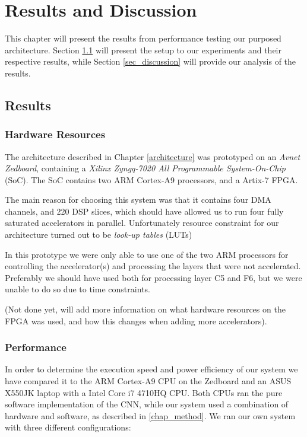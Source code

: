 \chapter{Results and Discussion} \label{chap_results}

This chapter will present the results from performance testing our purposed architecture. Section \ref{sec_results} will present the setup to our experiments and their respective results, while Section \ref{sec_discussion} will provide our analysis of the results. 

\section{Results} \label{sec_results}

\subsection{Hardware Resources}

The architecture described in Chapter \ref{architecture} was prototyped on an \textit{Avnet Zedboard}, containing a \textit{Xilinx Zyngq-7020 All Programmable System-On-Chip} (SoC). The SoC contains two ARM Cortex-A9 processors, and a Artix-7 FPGA. 

The main reason for choosing this system was that it contains four DMA channels, and 220 DSP slices, which should have allowed us to run four fully saturated accelerators in parallel. Unfortunately resource constraint for our architecture turned out to be \textit{look-up tables} (LUTs)

In this prototype we were only able to use one of the two ARM processors for controlling the accelerator(s) and processing the layers that were not accelerated. Preferably we should have used both for processing layer C5 and F6, but we were unable to do so due to time constraints. 

(Not done yet, will add more information on what hardware resources on the FPGA was used, and how this changes when adding more accelerators). 


\subsection{Performance}

In order to determine the execution speed and power efficiency of our system we have compared it to the ARM Cortex-A9 CPU on the Zedboard and an ASUS X550JK laptop with a Intel Core i7 4710HQ CPU. Both CPUs ran the pure software implementation of the CNN, while our system used a combination of hardware and software, as described in \ref{chap_method}. We ran our own system with three different configurations:

